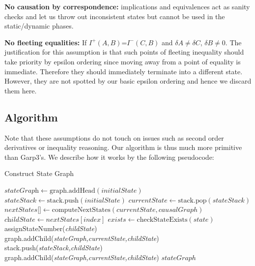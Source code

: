 \documentclass{article}
\begin{document}
\textbf{No causation by correspondence:} implications and equivalences act as sanity checks and let us throw out inconsistent states but cannot be used in the static/dynamic phases.

\textbf{No fleeting equalities:} If $I^+(A,B)$=$I^-(C,B)$ and $\delta A \neq \delta C$, $\delta B \neq 0$. The justification for this assumption is that such points of fleeting inequality should take priority by epsilon ordering since moving away from a point of equality is immediate. Therefore they should immediately terminate into a different state. However, they are not spotted by our basic epsilon ordering and hence we discard them here.

\subsection{Algorithm}

Note that these assumptions do not touch on issues such as second order derivatives or inequality reasoning. Our algorithm is thus much more primitive than Garp3's. We describe how it works by the following pseudocode:

\begin{algorithm}
	\caption{Construct State Graph}\label{stategraph}
	\begin{algorithmic}[1]
		\State $\textit{stateGraph} \gets \text{graph.addHead}(\textit{initialState})$
		\State $\textit{stateStack} \gets \text{stack.push}(\textit{initialState})$
		\State $\textit{currentState} \gets \text{stack.pop}(stateStack)$
		\State $\textit{nextStates[]} \gets \text{computeNextStates}(currentState,causalGraph)$
		\State $\textit{childState} \gets nextStates[index]$
		\State $\textit{exists} \gets \text{checkStateExists}(state)$
		\State assignStateNumber(\textit{childState})
		\State graph.addChild(\textit{stateGraph,currentState,childState})
		\State stack.push(\textit{stateStack,childState})
		\Else 
		\State graph.addChild(\textit{stateGraph,currentState,childState})
		\EndIf
		\EndFor
		\EndWhile
		\State \Return $stateGraph$
		\EndProcedure
	\end{algorithmic}
\end{algorithm}
\end{document}
